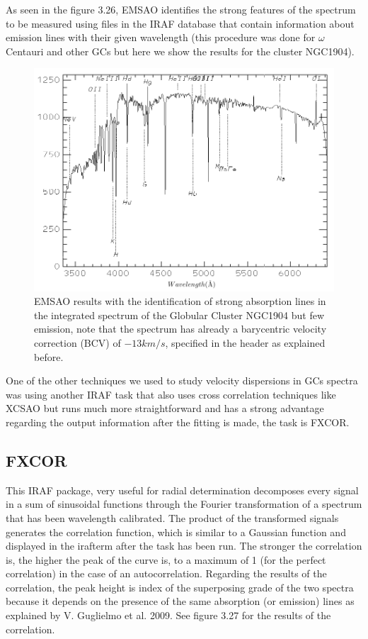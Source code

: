 As seen in the figure 3.26, EMSAO identifies the strong features of the spectrum to be measured using files in the IRAF database that contain information about emission lines with their given wavelength (this procedure was done for $\omega$ Centauri and other GCs but here we show the results for the cluster NGC1904).  

\begin{figure}[]
\centering
\includegraphics[width=13cm]{images/emsao.png}
\caption[EMSAO results with the identification of lines]{EMSAO results with the identification of strong absorption lines in the integrated spectrum of the Globular Cluster NGC1904 but few emission, note that the spectrum has already a barycentric velocity correction (BCV) of $-13km/s$, specified in the header as explained before.}
\end{figure}

One of the other techniques we used to study velocity dispersions in GCs spectra was using another IRAF task that also uses cross correlation techniques like XCSAO but runs much more straightforward and has a strong advantage regarding the output information after the fitting is made, the task is FXCOR. 

\subsection{FXCOR}

This IRAF package, very useful for radial determination decomposes every signal in a sum of sinusoidal functions through the Fourier transformation of a spectrum that has been wavelength calibrated. The product of the transformed signals generates the correlation function, which is similar to a Gaussian function and displayed in the irafterm after the task has been run. The stronger the correlation is, the higher the peak of the curve is, to a maximum of 1 (for the perfect correlation) in the case of an autocorrelation. Regarding the results of the correlation, the peak height is index of the superposing grade of the two spectra because it depends on the presence of the same absorption (or emission) lines as explained by V. Guglielmo et al. 2009.  See figure 3.27 for the results of the correlation.

